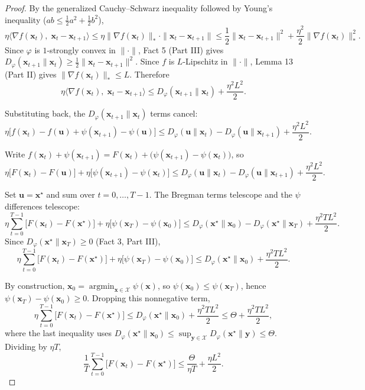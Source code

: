 \documentclass[12pt]{article}
\begin{document}
\begin{proof}
By the generalized Cauchy--Schwarz inequality followed by Young's inequality ($ab \le \tfrac{1}{2}a^2 + \tfrac{1}{2}b^2$),
\[
\eta\langle \nabla f(\mathbf{x}_t),\; \mathbf{x}_t - \mathbf{x}_{t+1}\rangle
\le \eta\|\nabla f(\mathbf{x}_t)\|_* \cdot \|\mathbf{x}_t - \mathbf{x}_{t+1}\|
\le \frac{1}{2}\|\mathbf{x}_t - \mathbf{x}_{t+1}\|^2 + \frac{\eta^2}{2}\|\nabla f(\mathbf{x}_t)\|_*^2.
\]
Since $\varphi$ is $1$-strongly convex in $\|\cdot\|$, Fact 5 (Part III) gives $D_\varphi(\mathbf{x}_{t+1} \| \mathbf{x}_t) \ge \tfrac{1}{2}\|\mathbf{x}_t - \mathbf{x}_{t+1}\|^2$. Since $f$ is $L$-Lipschitz in $\|\cdot\|$, Lemma 13 (Part II) gives $\|\nabla f(\mathbf{x}_t)\|_* \le L$. Therefore
\[
\eta\langle \nabla f(\mathbf{x}_t),\; \mathbf{x}_t - \mathbf{x}_{t+1}\rangle
\le D_\varphi(\mathbf{x}_{t+1} \| \mathbf{x}_t) + \frac{\eta^2 L^2}{2}.
\]

Substituting back, the $D_\varphi(\mathbf{x}_{t+1} \| \mathbf{x}_t)$ terms cancel:
\[
\eta\bigl[f(\mathbf{x}_t) - f(\mathbf{u}) + \psi(\mathbf{x}_{t+1}) - \psi(\mathbf{u})\bigr]
\le D_\varphi(\mathbf{u} \| \mathbf{x}_t) - D_\varphi(\mathbf{u} \| \mathbf{x}_{t+1}) + \frac{\eta^2 L^2}{2}.
\]

Write $f(\mathbf{x}_t) + \psi(\mathbf{x}_{t+1}) = F(\mathbf{x}_t) + \bigl(\psi(\mathbf{x}_{t+1}) - \psi(\mathbf{x}_t)\bigr)$, so
\[
\eta\bigl[F(\mathbf{x}_t) - F(\mathbf{u})\bigr] + \eta\bigl[\psi(\mathbf{x}_{t+1}) - \psi(\mathbf{x}_t)\bigr]
\le D_\varphi(\mathbf{u} \| \mathbf{x}_t) - D_\varphi(\mathbf{u} \| \mathbf{x}_{t+1}) + \frac{\eta^2 L^2}{2}.
\]

Set $\mathbf{u} = \mathbf{x}^\star$ and sum over $t = 0, \dots, T-1$. The Bregman terms telescope and the $\psi$ differences telescope:
\[
\eta\sum_{t=0}^{T-1}\bigl[F(\mathbf{x}_t) - F(\mathbf{x}^\star)\bigr] + \eta\bigl[\psi(\mathbf{x}_T) - \psi(\mathbf{x}_0)\bigr]
\le D_\varphi(\mathbf{x}^\star \| \mathbf{x}_0) - D_\varphi(\mathbf{x}^\star \| \mathbf{x}_T) + \frac{\eta^2 T L^2}{2}.
\]
Since $D_\varphi(\mathbf{x}^\star \| \mathbf{x}_T) \ge 0$ (Fact 3, Part III),
\[
\eta\sum_{t=0}^{T-1}\bigl[F(\mathbf{x}_t) - F(\mathbf{x}^\star)\bigr] + \eta\bigl[\psi(\mathbf{x}_T) - \psi(\mathbf{x}_0)\bigr]
\le D_\varphi(\mathbf{x}^\star \| \mathbf{x}_0) + \frac{\eta^2 T L^2}{2}.
\]

By construction, $\mathbf{x}_0 = \operatorname{argmin}_{\mathbf{x} \in \mathcal{X}} \psi(\mathbf{x})$, so $\psi(\mathbf{x}_0) \le \psi(\mathbf{x}_T)$, hence $\psi(\mathbf{x}_T) - \psi(\mathbf{x}_0) \ge 0$. Dropping this nonnegative term,
\[
\eta\sum_{t=0}^{T-1}\bigl[F(\mathbf{x}_t) - F(\mathbf{x}^\star)\bigr]
\le D_\varphi(\mathbf{x}^\star \| \mathbf{x}_0) + \frac{\eta^2 T L^2}{2}
\le \Theta + \frac{\eta^2 T L^2}{2},
\]
where the last inequality uses $D_\varphi(\mathbf{x}^\star \| \mathbf{x}_0) \le \sup_{\mathbf{y} \in \mathcal{X}} D_\varphi(\mathbf{x}^\star \| \mathbf{y}) \le \Theta$. Dividing by $\eta T$,
\[
\frac{1}{T}\sum_{t=0}^{T-1}\bigl[F(\mathbf{x}_t) - F(\mathbf{x}^\star)\bigr]
\le \frac{\Theta}{\eta T} + \frac{\eta L^2}{2}.
\]


\end{proof}
\end{document}
